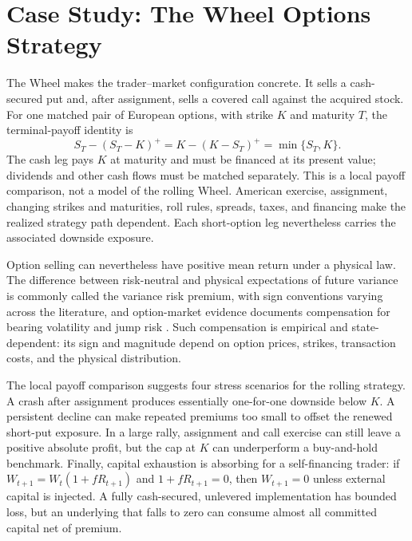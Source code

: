 \documentclass[aps,pra,reprint,superscriptaddress,amsmath,amssymb,floatfix]{revtex4-2}
\theoremstyle{plain}
\theoremstyle{definition}
\theoremstyle{remark}
\begin{document}
\section{Case Study: The Wheel Options Strategy}
\label{sec:wheel}

The Wheel makes the trader--market configuration concrete. It sells a
cash-secured put and, after assignment, sells a covered call against the
acquired stock. For one matched pair of European options, with strike \(K\)
and maturity \(T\), the terminal-payoff identity is
\begin{equation}
  S_T-(S_T-K)^+
  =K-(K-S_T)^+
  =\min\{S_T,K\}.
  \label{eq:putcall}
\end{equation}
The cash leg pays \(K\) at maturity and must be financed at its present value;
dividends and other cash flows must be matched separately. This is a local
payoff comparison, not a model of the rolling Wheel. American exercise,
assignment, changing strikes and maturities, roll rules, spreads, taxes, and
financing make the realized strategy path dependent. Each short-option leg
nevertheless carries the associated downside exposure.

Option selling can nevertheless have positive mean return under a physical
law. The
difference between risk-neutral and physical expectations of future variance
is commonly called the variance risk premium, with sign conventions varying
across the literature, and option-market evidence documents compensation for
bearing volatility and jump risk
\cite{BakshiKapadia2003,CarrWu2009}. Such compensation is empirical and
state-dependent: its sign and magnitude depend on option prices, strikes,
transaction costs, and the physical distribution.

The local payoff comparison suggests four stress scenarios for the rolling strategy. A crash
after assignment produces essentially one-for-one downside below \(K\). A
persistent decline can make repeated premiums too small to offset the renewed
short-put exposure. In a large rally, assignment and call exercise can still
leave a positive absolute profit, but the cap at \(K\) can underperform a
buy-and-hold benchmark. Finally, capital exhaustion is absorbing for a
self-financing trader: if \(W_{t+1}=W_t(1+fR_{t+1})\) and
\(1+fR_{t+1}=0\), then \(W_{t+1}=0\) unless external capital is injected. A
fully cash-secured, unlevered implementation has bounded loss, but an
underlying that falls to zero can consume almost all committed capital net of
premium.
\end{document}
